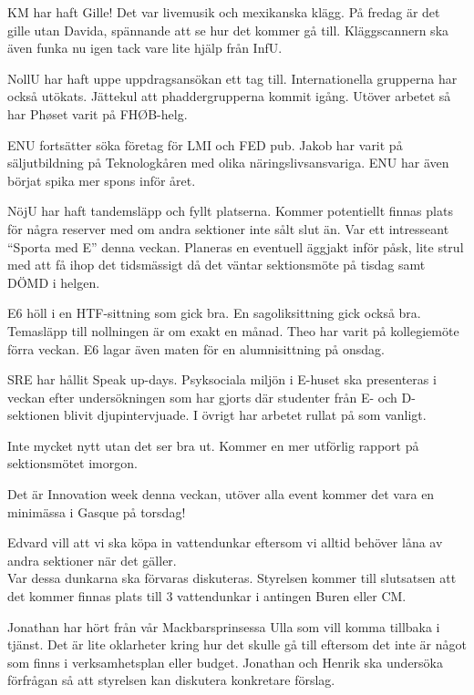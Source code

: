 \documentclass[10pt]{article}
\begin{document}
\begin{paragrafer}
\begin{paragrafer}
KM har haft Gille! Det var livemusik och mexikanska klägg. På fredag är det gille utan Davida, spännande att se hur det kommer gå till. Kläggscannern ska även funka nu igen tack vare lite hjälp från InfU.

NollU har haft uppe uppdragsansökan ett tag till. Internationella grupperna har också utökats. Jättekul att phaddergrupperna kommit igång. Utöver arbetet så har Phøset varit på FHØB-helg.

ENU fortsätter söka företag för LMI och FED pub. Jakob har varit på säljutbildning på Teknologkåren med olika näringslivsansvariga. ENU har även börjat spika mer spons inför året.

NöjU har haft tandemsläpp och fyllt platserna. Kommer potentiellt finnas plats för några reserver med om andra sektioner inte sålt slut än. Var ett intresseant ``Sporta med E'' denna veckan. Planeras en eventuell äggjakt inför påsk, lite strul med att få ihop det tidsmässigt då det väntar sektionsmöte på tisdag samt DÖMD i helgen.

E6 höll i en HTF-sittning som gick bra. En sagoliksittning gick också bra. Temasläpp till nollningen är om exakt en månad. Theo har varit på kollegiemöte förra veckan. E6 lagar även maten för en alumnisittning på onsdag.

SRE har hållit Speak up-days. Psyksociala miljön i E-huset ska presenteras i veckan efter undersökningen som har gjorts där studenter från E- och D-sektionen blivit djupintervjuade. I övrigt har arbetet rullat på som vanligt.



Inte mycket nytt utan det ser bra ut. Kommer en mer utförlig rapport på sektionsmötet imorgon.

Det är Innovation week denna veckan, utöver alla event kommer det vara en minimässa i Gasque på torsdag!

\end{paragrafer}

Edvard vill att vi ska köpa in vattendunkar eftersom vi alltid behöver låna av andra sektioner när det gäller.  \\
Var dessa dunkarna ska förvaras diskuteras. Styrelsen kommer till slutsatsen att det kommer finnas plats till 3 vattendunkar i antingen Buren eller CM.

\Mbaby

Jonathan har hört från vår Mackbarsprinsessa Ulla som vill komma tillbaka i tjänst. Det är lite oklarheter kring hur det skulle gå till eftersom det inte är något som finns i verksamhetsplan eller budget. Jonathan och Henrik ska undersöka förfrågan så att styrelsen kan diskutera konkretare förslag.


\end{paragrafer}
\end{document}
